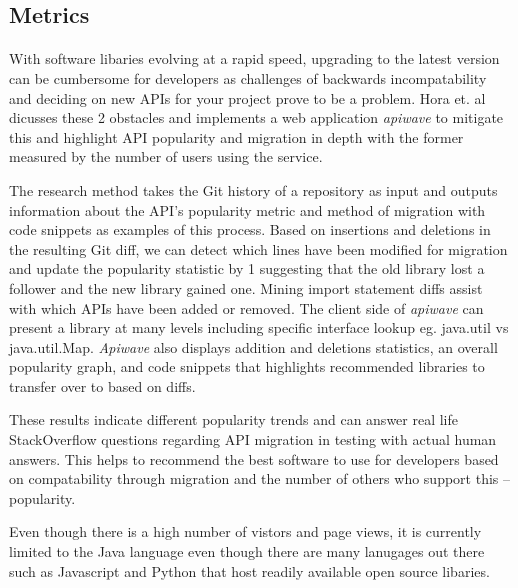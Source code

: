 \documentclass[12pt]{article}
\begin{document}


\subsection{Metrics}
\paragraph{}
With software libaries evolving at a rapid speed, upgrading to the latest version can be cumbersome for developers
as challenges of backwards incompatability and deciding on new APIs for your project prove to be a problem.
Hora et. al \cite{apiwave} dicusses these 2 obstacles and implements a web application \textit{apiwave} \cite{apiwavewebsite} to mitigate this and
highlight API popularity and migration in depth with the former measured by the number of users using the service.

The research method takes the Git history of a repository as input and outputs information about the API's popularity metric 
and method of migration with code snippets as examples of this process.
Based on insertions and deletions in the resulting Git diff, we can detect which lines have been modified for migration 
and update the popularity statistic by 1 suggesting that the old library lost a follower and the new library gained one.
Mining import statement diffs assist with which APIs have been added or removed.
The client side of \textit{apiwave} \cite{apiwavewebsite} can present a library at many levels including specific interface lookup eg. java.util vs java.util.Map.
\textit{Apiwave} also displays addition and deletions statistics, an overall popularity graph, 
and code snippets that highlights recommended libraries to transfer over to based on diffs.

These results indicate different popularity trends and can answer real life StackOverflow \cite{stackoverflow} 
questions regarding API migration in testing with actual human answers. 
This helps to recommend the best software to use for developers based on compatability through migration
and the number of others who support this -- popularity.

Even though there is a high number of vistors and page views, it is currently limited to the Java language even though there are many lanugages out there
such as Javascript and Python that host readily available open source libaries. 
\end{document}
